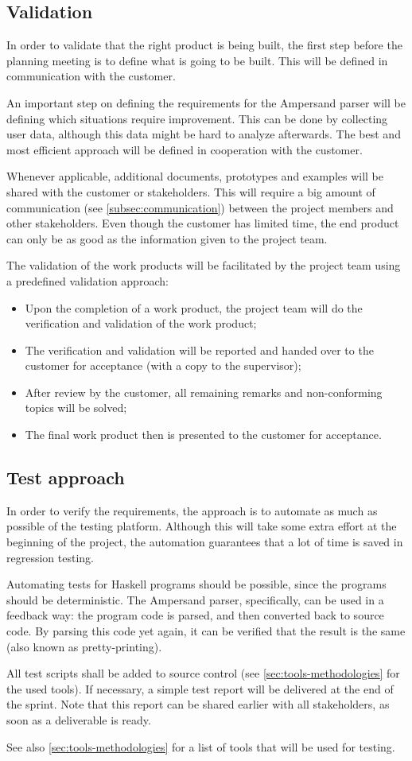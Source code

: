 \subsection{Validation}
In order to validate that the right product is being built, the first step before the planning meeting is to define what is going to be built.
This will be defined in communication with the customer.

An important step on defining the requirements for the Ampersand parser will be defining which situations require improvement.
This can be done by collecting user data, although this data might be hard to analyze afterwards.
The best and most efficient approach will be defined in cooperation with the customer.

Whenever applicable, additional documents, prototypes and examples will be shared with the customer or stakeholders.
This will require a big amount of communication (see \autoref{subsec:communication}) between the project members and other stakeholders.
Even though the customer has limited time, the end product can only be as good as the information given to the project team.

The validation of the work products will be facilitated by the project team using a predefined validation approach:
\begin{itemize}
	\item Upon the completion of a work product, the project team will do the verification and validation of the work product;
	\item The verification and validation will be reported and handed over to the customer for acceptance (with a copy to the supervisor);
	\item After review by the customer, all remaining remarks and non-conforming topics will be solved;
	\item The final work product then is presented to the customer for acceptance.
\end{itemize}

\subsection{Test approach}
In order to verify the requirements, the approach is to automate as much as possible of the testing platform.
Although this will take some extra effort at the beginning of the project, the automation guarantees that a lot of time is saved in regression testing.

Automating tests for Haskell programs should be possible, since the programs should be deterministic.
The Ampersand parser, specifically, can be used in a feedback way: the program code is parsed, and then converted back to source code.
By parsing this code yet again, it can be verified that the result is the same (also known as pretty-printing).

All test scripts shall be added to source control (see \autoref{sec:tools-methodologies} for the used tools).
If necessary, a simple test report will be delivered at the end of the sprint.
Note that this report can be shared earlier with all stakeholders, as soon as a deliverable is ready.

See also \autoref{sec:tools-methodologies} for a list of tools that will be used for testing.
